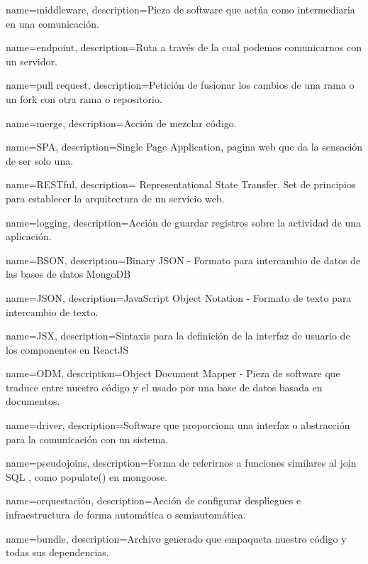 {
name={middleware},
description={Pieza de software que actúa como intermediaria en una comunicación.}
}

{
name={endpoint},
description={Ruta a través de la cual podemos comunicarnos con un servidor.}
}

{
name={pull request},
description={Petición de fusionar los cambios de una rama o un fork con otra rama o repositorio.}
}

{
name={merge},
description={Acción de mezclar código.}
}

{
name={SPA},
description={Single Page Application, pagina web que da la sensación de ser solo una.}
}

{
name={RESTful},
description={ Representational State Transfer. Set de principios para establecer la arquitectura de un servicio web.}
}

{
name={logging},
description={Acción de guardar registros sobre la actividad de una aplicación.}
}

{
name={BSON},
description={Binary JSON - Formato para intercambio de datos de las bases de datos MongoDB}
}

{
name={JSON},
description={JavaScript Object Notation - Formato de texto para intercambio de texto.}
}

{
name={JSX},
description={Sintaxis para la definición de la interfaz de usuario de los componentes en ReactJS}
}

{
name={ODM},
description={Object Document Mapper - Pieza de software que traduce entre nuestro código y el usado por una base de datos basada en documentos.}
}

{
name={driver},
description={Software que proporciona una interfaz o abstracción para la comunicación con un sistema.}
}

{
name={pseudojoins},
description={Forma de referirnos a funciones similares al join SQL , como populate() en mongoose.}
}

{
name={orquestación},
description={Acción de configurar despliegues e infraestructura de forma automática o semiautomática.}
}

{
name={bundle},
description={Archivo generado que empaqueta nuestro código y todas sus dependencias.}
}


